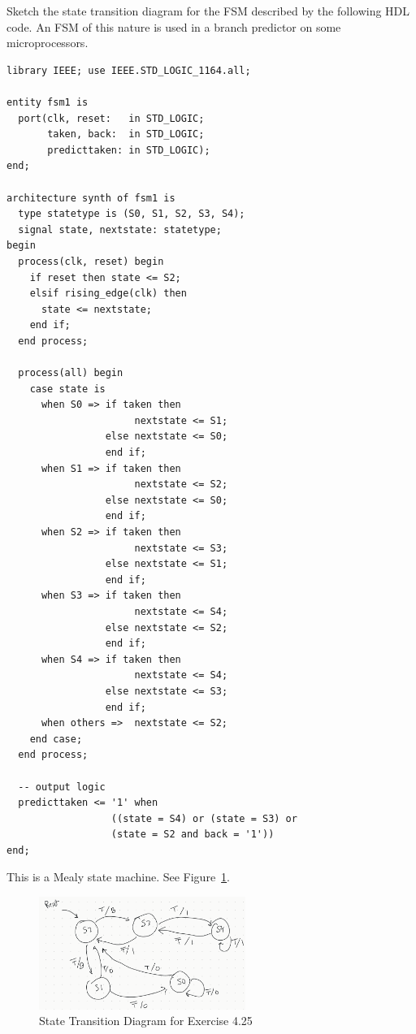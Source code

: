 \documentclass[12pt]{article}
\newenvironment{ex}[2][Exercise]{\begin{trivlist}
		\item[\hskip \labelsep {\bfseries #1}\hskip \labelsep {\bfseries #2.}]}{\end{trivlist}}
\newenvironment{sol}[1][Solution]{\begin{trivlist}
		\item[\hskip \labelsep {\bfseries #1:}]}{\end{trivlist}}
\begin{document}
\begin{ex}{4.25}
	Sketch the state transition diagram for the FSM described by the following HDL code.
	An FSM of this nature is used in a branch predictor on some microprocessors.
	\begin{lstlisting}
library IEEE; use IEEE.STD_LOGIC_1164.all;

entity fsm1 is
  port(clk, reset:   in STD_LOGIC;
       taken, back:  in STD_LOGIC;
       predicttaken: in STD_LOGIC);
end;

architecture synth of fsm1 is
  type statetype is (S0, S1, S2, S3, S4);
  signal state, nextstate: statetype;
begin
  process(clk, reset) begin
    if reset then state <= S2;
    elsif rising_edge(clk) then
      state <= nextstate;
    end if;
  end process;
  
  process(all) begin
    case state is
      when S0 => if taken then
      				  nextstate <= S1;
      			 else nextstate <= S0;
      			 end if;
      when S1 => if taken then
       				  nextstate <= S2;
       			 else nextstate <= S0;
       			 end if;
      when S2 => if taken then
       				  nextstate <= S3;
       			 else nextstate <= S1;
       			 end if;
      when S3 => if taken then
        			  nextstate <= S4;
        		 else nextstate <= S2;
        		 end if;
      when S4 => if taken then
           			  nextstate <= S4;
           		 else nextstate <= S3;
           		 end if;
      when others =>  nextstate <= S2;
    end case;
  end process;
  
  -- output logic
  predicttaken <= '1' when
                  ((state = S4) or (state = S3) or
                  (state = S2 and back = '1'))
end;
	\end{lstlisting}
\end{ex}

\begin{sol}
	This is a Mealy state machine. See Figure~\ref{04-25-state-transition-diagram}.
	\begin{figure}
		\centering
		\includegraphics[width=0.6\textwidth]{04-25-state-transition-diagram}
		\caption{State Transition Diagram for Exercise 4.25}
		\label{04-25-state-transition-diagram}
	\end{figure}
\end{sol}
\end{document}
